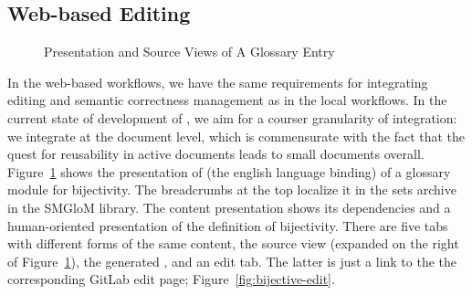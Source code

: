 \subsection{Web-based \sys Editing}\label{sec:web}

\begin{figure}[ht]\centering
  \quad
  \caption{Presentation and Source Views of A Glossary Entry}\label{fig:bijective}
\end{figure}

In the web-based workflows, we have the same requirements for integrating editing and
semantic correctness management as in the local workflows. In the current state of
development of \sys, we aim for a courser granularity of integration: we integrate at the
document level, which is commensurate with the fact that the quest for reusability in
active documents leads to small documents overall. Figure~\ref{fig:bijective} shows the
presentation of (the english language binding) of a glossary module for bijectivity. The
breadcrumbs at the top localize it in the \textsf{sets} archive in the \textsf{SMGloM}
library. The content presentation shows its dependencies and a human-oriented presentation
of the definition of bijectivity. There are five tabs with different forms of the same
content, the source view (expanded on the right of Figure~\ref{fig:bijective}), the
generated \omdoc, and an edit tab. The latter is just a link to the the corresponding
GitLab edit page; Figure~\ref{fig:bijective-edit}. 

